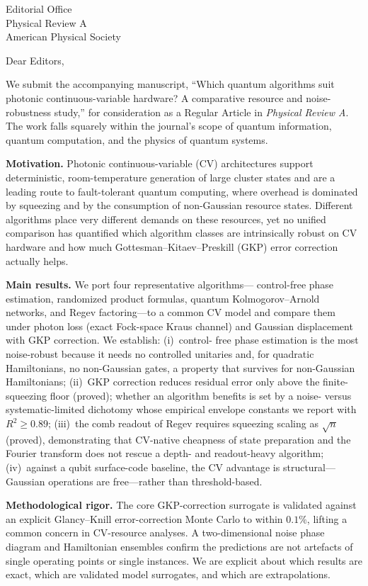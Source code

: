 \documentclass[11pt]{letter}
\begin{document}
\begin{letter}{Editorial Office \\ Physical Review A \\ American Physical
Society}

\opening{Dear Editors,}

We submit the accompanying manuscript, ``Which quantum algorithms suit
photonic continuous-variable hardware? A comparative resource and
noise-robustness study,'' for consideration as a Regular Article in
\emph{Physical Review A}. The work falls squarely within the journal's
scope of quantum information, quantum computation, and the physics of
quantum systems.

\textbf{Motivation.} Photonic continuous-variable (CV) architectures
support deterministic, room-temperature generation of large cluster
states and are a leading route to fault-tolerant quantum computing,
where overhead is dominated by squeezing and by the consumption of
non-Gaussian resource states. Different algorithms place very different
demands on these resources, yet no unified comparison has quantified
which algorithm classes are intrinsically robust on CV hardware and how
much Gottesman--Kitaev--Preskill (GKP) error correction actually helps.

\textbf{Main results.} We port four representative algorithms---%
control-free phase estimation, randomized product formulas, quantum
Kolmogorov--Arnold networks, and Regev factoring---to a common CV model
and compare them under photon loss (exact Fock-space Kraus channel) and
Gaussian displacement with GKP correction. We establish: (i)~control-%
free phase estimation is the most noise-robust because it needs no
controlled unitaries and, for quadratic Hamiltonians, no non-Gaussian
gates, a property that survives for non-Gaussian Hamiltonians;
(ii)~GKP correction reduces residual error only above the finite-%
squeezing floor (proved); whether an algorithm benefits is set by a
noise- versus systematic-limited dichotomy whose empirical envelope
constants we report with $R^{2}\!\ge\!0.89$; (iii)~the comb readout of
Regev requires squeezing scaling as $\sqrt{n}$ (proved), demonstrating
that CV-native cheapness of state preparation and the Fourier transform
does not rescue a depth- and readout-heavy algorithm; (iv)~against a
qubit surface-code baseline, the CV advantage is structural---Gaussian
operations are free---rather than threshold-based.

\textbf{Methodological rigor.} The core GKP-correction surrogate is
validated against an explicit Glancy--Knill error-correction Monte Carlo
to within $0.1\%$, lifting a common concern in CV-resource analyses. A
two-dimensional noise phase diagram and Hamiltonian ensembles confirm
the predictions are not artefacts of single operating points or single
instances. We are explicit about which results are exact, which are
validated model surrogates, and which are extrapolations.


\end{letter}
\end{document}
